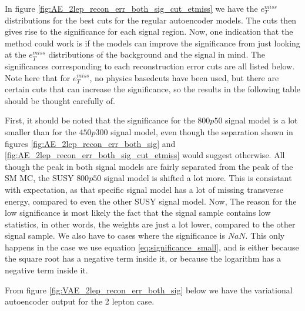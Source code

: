 In figure \ref{fig:AE_2lep_recon_err_both_sig_cut_etmiss} we have the $e_T^{miss}$ distributions for the best cuts for the regular autoencoder models.
The cuts then gives rise to the significance for each signal region. Now, one indication that the method could work is if the models can improve the 
significance from just looking at the $e_T^{miss}$ distributions of the background and the signal in mind. The significances corresponding to each 
reconstruction error cuts are all listed below. Note here that for $e_T^{miss}$, no physics basedcuts have been used, but there are certain cuts 
that can increase the significance, so the results in the following table should be thought carefully of. \par 


First, it should be noted that the significance for the $800p50$ signal model is a lot smaller than for the $450p300$ signal model, even though the separation shown in 
figures \ref{fig:AE_2lep_recon_err_both_sig} and \ref{fig:AE_2lep_recon_err_both_sig_cut_etmiss} would suggest otherwise. All though the peak in both signal models are 
fairly separated from the peak of the SM MC, the SUSY $800p50$ signal model is shifted a lot more. This is consistant with expectation, as that specific signal model 
has a lot of missing transverse energy, compared to even the other SUSY signal model. Now, The reason for the low significance is most likely the fact that the signal sample 
contains low statistics, in other words, the weights are just a lot lower, compared to the other signal sample. We also have to cases where the significance is $NaN$. 
This only happens in the case we use equation \ref{eq:significance_small}, and is either because the square root has a negative term inside it, or because the logarithm 
has a negative term inside it. \par

From figure \ref{fig:VAE_2lep_recon_err_both_sig} below we have the variational autoencoder output for the 2 lepton case. 

